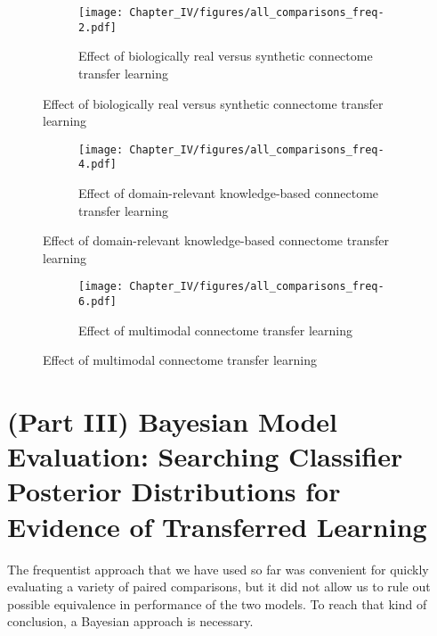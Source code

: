 \documentclass[
  notitlepage]{article}
\begin{document}
\begin{figure}
    \ContinuedFloat
    \centering
    \begin{subfigure}{0.8\textwidth}
        \centering
        \caption{\label{fig:all_comparison_freqA}\scriptsize{Effect of biologically real versus synthetic connectome transfer learning}}
          \texttt{[image: Chapter\_IV/figures/all\_comparisons\_freq-2.pdf]}
    \end{subfigure}
\end{figure}
\begin{figure}
    \ContinuedFloat
    \centering
    \begin{subfigure}{0.8\textwidth}
       \centering
       \caption{\label{fig:all_comparison_freqB}\scriptsize{Effect of domain-relevant knowledge-based connectome transfer learning}}
        \texttt{[image: Chapter\_IV/figures/all\_comparisons\_freq-4.pdf]}
    \end{subfigure}
\end{figure}
\begin{figure}
    \ContinuedFloat
    \centering
    \begin{subfigure}{0.8\textwidth}
       \centering
       \caption{\label{fig:all_comparison_freqC}\scriptsize{Effect of multimodal connectome transfer learning}}
        \texttt{[image: Chapter\_IV/figures/all\_comparisons\_freq-6.pdf]}
    \end{subfigure}
\end{figure}
\setlength{\belowcaptionskip}{-10pt}

\hypertarget{part-iii-bayesian-model-evaluation-searching-classifier-posterior-distributions-for-evidence-of-transferred-learning}{%
\section{(Part III) Bayesian Model Evaluation: Searching Classifier
Posterior Distributions for Evidence of Transferred
Learning}\label{part-iii-bayesian-model-evaluation-searching-classifier-posterior-distributions-for-evidence-of-transferred-learning}}
The frequentist approach that we have used so far was convenient for quickly evaluating a variety of paired comparisons, but it did not allow us to rule out possible equivalence in performance of the two models. To reach that kind of conclusion, a Bayesian approach is necessary.
\end{document}

